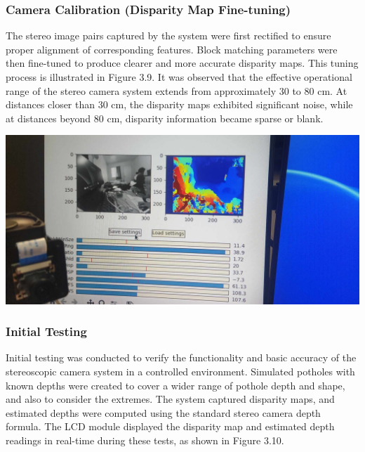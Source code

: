 \subsubsection{Camera Calibration (Disparity  Map Fine-tuning)}
The stereo image pairs captured by the system were first rectified to ensure proper alignment of corresponding features. Block matching parameters were then fine-tuned to produce clearer and more accurate disparity maps. This tuning process is illustrated in Figure 3.9. It was observed that the effective operational range of the stereo camera system extends from approximately 30 to 80 cm. At distances closer than 30 cm, the disparity maps exhibited significant noise, while at distances beyond 80 cm, disparity information became sparse or blank.

\begin{center}
	\includegraphics[scale=0.15]{calibration2.jpg}
\end{center}

\subsubsection{Initial Testing}
Initial testing was conducted to verify the functionality and basic accuracy of the stereoscopic camera system in a controlled environment. Simulated potholes with known depths were created to cover a wider range of pothole depth and shape, and also to consider the extremes. The system captured disparity maps, and estimated depths were computed using the standard stereo camera depth formula. The LCD module displayed the disparity map and estimated depth readings in real-time during these tests, as shown in Figure 3.10.

